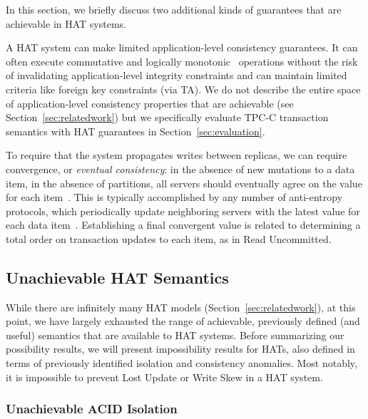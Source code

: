 In this section, we briefly discuss two additional kinds of guarantees
that are achievable in HAT systems.

\vspace{0.5em}
 A HAT system can make limited
application-level consistency guarantees. It can often execute
commutative and logically monotonic~\cite{calm} operations without the
risk of invalidating application-level integrity constraints and can
maintain limited criteria like foreign key constraints (via TA). We do
not describe the entire space of application-level consistency
properties that are achievable (see Section~\ref{sec:relatedwork}) but
we specifically evaluate TPC-C transaction semantics with HAT
guarantees in Section~\ref{sec:evaluation}.

\vspace{.5em} To require that the
system propagates writes between replicas, we can require convergence,
or \textit{eventual consistency}: in the absence of new mutations to a
data item, in the absence of partitions, all servers should eventually
agree on the value for each item~\cite{cac, vogels-defs}. This is
typically accomplished by any number of anti-entropy protocols, which
periodically update neighboring servers with the latest value for each
data item~\cite{antientropy}. Establishing a final convergent value is
related to determining a total order on transaction updates to each
item, as in Read Uncommitted.

\subsection{Unachievable HAT Semantics}
\label{sec:unachievable-hat}

While there are infinitely many HAT models
(Section~\ref{sec:relatedwork}), at this point, we have largely
exhausted the range of achievable, previously defined (and useful)
semantics that are available to HAT systems. Before summarizing our
possibility results, we will present impossibility results for HATs,
also defined in terms of previously identified isolation and
consistency anomalies. Most notably, it is impossible to
prevent Lost Update or Write Skew in a HAT system.

\subsubsection{Unachievable ACID Isolation}
\label{sec:unachievable-acid}

